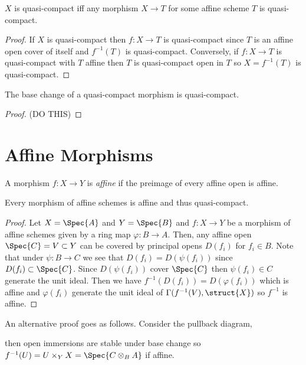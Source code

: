 \documentclass[12pt]{article}
\begin{document}
\begin{proposition}
$X$ is quasi-compact iff any morphism $X \to T$ for some affine scheme $T$ is quasi-compact.
\end{proposition}

\begin{proof}
If $X$ is quasi-compact then $f : X \to T$ is quasi-compact since $T$ is an affine open cover of itself and $f^{-1}(T)$ is quasi-compact. Conversely, if $f : X \to T$ is quasi-compact with $T$ affine then $T$ is quasi-compact open in $T$ so $X = f^{-1}(T)$ is quasi-compact.
\end{proof}

\begin{lemma}
The base change of a quasi-compact morphism is quasi-compact.
\end{lemma}

\begin{proof}
(DO THIS)
\end{proof}

\section{Affine Morphisms}

\begin{defn}
A morphism $f : X \to Y$ is \textit{affine} if the preimage of every affine open is affine.
\end{defn}

\begin{lemma}
Every morphism of affine schemes is affine and thus quasi-compact.
\end{lemma}

\begin{proof}
Let $X = \Spec{A}$ and $Y = \Spec{B}$ and $f : X \to Y$ be a morphism of affine schemes given by a ring map $\varphi : B \to A$. Then, any affine open $\Spec{C} = V \subset Y$ can be covered by principal opens $D(f_i)$ for $f_i \in B$. Note that under $\psi : B \to C$ we see that $D(f_i) = D(\psi(f_i))$ since $D(f_i) \subset \Spec{C}$. Since $D(\psi(f_i))$ cover $\Spec{C}$ then $\psi(f_i) \in C$ generate the unit ideal. Then we have $f^{-1}(D(f_i)) = D(\varphi(f_i))$ which is affine and $\varphi(f_i)$ generate the unit ideal of $\Gamma(f^{-1}(V), \struct{X})$ so $f^{-1}$ is affine.
\end{proof}

\begin{rmk}
An alternative proof goes as follows. Consider the pullback diagram,
\begin{center}
\end{center}
then open immersions are stable under base change so $f^{-1}(U) = U \times_Y X = \Spec{C \otimes_B A}$ if affine.
\end{rmk}
\end{document}
